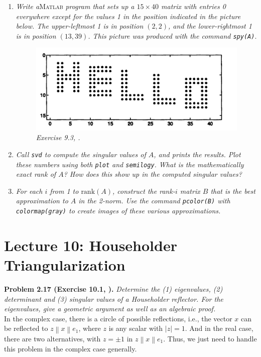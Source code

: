 \documentclass[a4paper,oneside]{book}
\numberwithin{equation}{chapter}
\begin{document}
\begin{enumerate}
\item \textit{Write a}\textsc{Matlab}\textit{ program that sets up a $15\times 40$ matrix with entries 0 everywhere except for the values 1 in the position indicated in the picture below. The upper-leftmost 1 is in position $\left(2,2\right)$, and the lower-rightmost 1 is in position $\left(13,39\right)$. This picture was produced with the command \texttt{spy(A)}}.
\begin{figure}[H]
	\centering
	\includegraphics[scale=0.35]{6}
	\caption{\textit{Exercise 9.3, \cite{1}.}}
\end{figure}
\item \textit{Call \texttt{svd} to compute the singular values of $A$, and prints the results. Plot these numbers using both \texttt{plot} and \texttt{semilogy}. What is the mathematically exact rank of $A$? How does this show up in the computed singular values?}
\item \textit{For each $i$ from 1 to $\mbox{rank}\left(A\right)$, construct the rank-$i$ matrix $B$ that is the best approximation to $A$ in the 2-norm. Use the command \texttt{pcolor(B)} with \texttt{colormap(gray)} to create images of these various approximations.}
\end{enumerate}

\section{Lecture 10: Householder Triangularization}
\textbf{Problem 2.17 (Exercise 10.1, \cite{1}).} \textit{Determine the (1) eigenvalues, (2) determinant and (3) singular values of a Householder reflector. For the eigenvalues, give a geometric argument as well as an algebraic proof.}\\

In the complex case, there is a circle of possible reflections, i.e., the vector $x$ can be reflected to $z\left\| x \right\|{e_1}$, where $z$ is any scalar with $\left| z \right| = 1$. And in the real case, there are two alternatives, with $z =  \pm 1$ in $z\left\| x \right\|{e_1}$. Thus, we just need to handle this problem in the complex case generally. 
\end{document}
